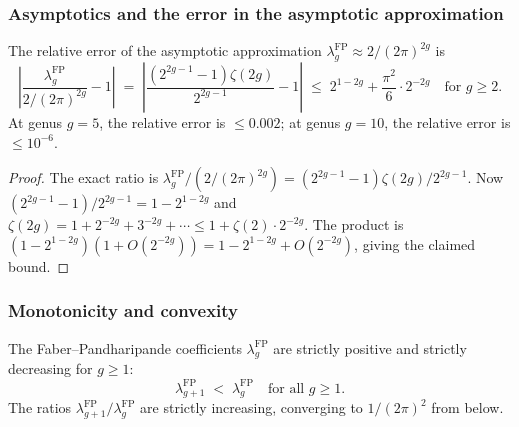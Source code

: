 \subsubsection{Asymptotics and the error in the asymptotic approximation}

\begin{proposition}
\label{prop:thqg-I-asymptotic-precision}
The relative error of the asymptotic approximation $\lambda_g^{\mathrm{FP}} \approx 2/(2\pi)^{2g}$ is
\begin{equation}\label{eq:thqg-I-relative-error}
\left|\frac{\lambda_g^{\mathrm{FP}}}{2/(2\pi)^{2g}} - 1\right| \;=\; \left|\frac{(2^{2g-1}-1)\zeta(2g)}{2^{2g-1}} - 1\right| \;\leq\; 2^{1-2g} + \frac{\pi^2}{6} \cdot 2^{-2g} \quad\text{for } g \geq 2.
\end{equation}
At genus $g = 5$, the relative error is $\leq 0.002$; at genus $g = 10$, the relative error is $\leq 10^{-6}$.
\end{proposition}

\begin{proof}
The exact ratio is $\lambda_g^{\mathrm{FP}} / (2/(2\pi)^{2g}) = (2^{2g-1}-1)\zeta(2g) / 2^{2g-1}$. Now $(2^{2g-1}-1)/2^{2g-1} = 1 - 2^{1-2g}$ and $\zeta(2g) = 1 + 2^{-2g} + 3^{-2g} + \cdots \leq 1 + \zeta(2) \cdot 2^{-2g}$. The product is $(1-2^{1-2g})(1 + O(2^{-2g})) = 1 - 2^{1-2g} + O(2^{-2g})$, giving the claimed bound.
\end{proof}

\subsubsection{Monotonicity and convexity}

\begin{proposition}
\label{prop:thqg-I-fp-monotone}
The Faber--Pandharipande coefficients $\lambda_g^{\mathrm{FP}}$ are strictly positive and strictly decreasing for $g \geq 1$:
\begin{equation}\label{eq:thqg-I-fp-monotone}
\lambda_{g+1}^{\mathrm{FP}} \;<\; \lambda_g^{\mathrm{FP}} \quad\text{for all } g \geq 1.
\end{equation}
The ratios $\lambda_{g+1}^{\mathrm{FP}}/\lambda_g^{\mathrm{FP}}$ are strictly increasing, converging to $1/(2\pi)^2$ from below.
\end{proposition}

